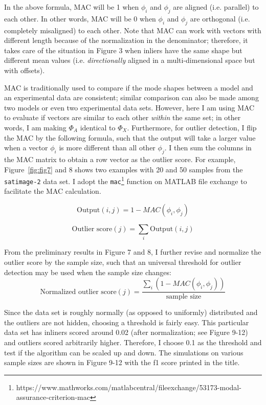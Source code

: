 \documentclass[12pt]{article}
\begin{document}
In the above formula, MAC will be 1 when $\phi_{i}$ and $\phi_{j}$ are aligned (i.e. parallel) to each other.
In other words, MAC will be 0 when $\phi_{i}$ and $\phi_{j}$ are orthogonal (i.e. completely misaligned) to each other.
Note that MAC can work with vectors with different length because of the normalization in the denominator;
therefore, it takes care of the situation in Figure 3 when inliers have the same shape but different mean values
(i.e. \textit{directionally} aligned in a multi-dimensional space but with offsets).

MAC is traditionally used to compare if the mode shapes between a model and an experimental data are consistent;
similar comparison can also be made among two models or even two experimental data sets.
However, here I am using MAC to evaluate if vectors are similar to each other \textit{within} the same set; in other words,
I am making $\Phi_A$ identical to $\Phi_X$. Furthermore, for outlier detection, I flip the MAC by the following formula, such that the output will take a larger value
when a vector $\phi_i$ is more different than all other $\phi_j$. I then sum the columns in the MAC matrix to obtain a row vector as the outlier score.
For example, Figure~\ref{fig:fig7} and 8 shows two examples with 20 and 50 samples from the \texttt{satimage-2} data set.
I adopt the \texttt{mac}\footnote{https://www.mathworks.com/matlabcentral/fileexchange/53173-modal-assurance-criterion-mac} function on MATLAB file exchange to facilitate the MAC calculation. 

\[
\text{Output}(i,j) = 1 - MAC(\phi_i,\phi_j)
\]

\[
\text{Outlier score}(j) = \sum_i \text{Output}(i,j)
\]

From the preliminary results in Figure 7 and 8, I further revise and normalize the outlier score by the sample size,
such that an universal threshold for outlier detection may be used when the sample size changes:
\[
\text{Normalized outlier score}(j) = \dfrac{{\sum}_i\left(1 - MAC(\phi_i,\phi_j)\right)}{\text{sample size}}
\]

Since the data set is roughly normally (as opposed to uniformly) distributed and the outliers are not hidden,
choosing a threshold is fairly easy. This particular data set has inliners scored around 0.02 (after normalization; see Figure 9-12) and outliers 
scored arbitrarily higher. Therefore, I choose 0.1 as the threshold and test if the algorithm can be scaled up and down.
The simulations on various sample sizes are shown in Figure 9-12 with the f1 score printed in the title.
\end{document}
